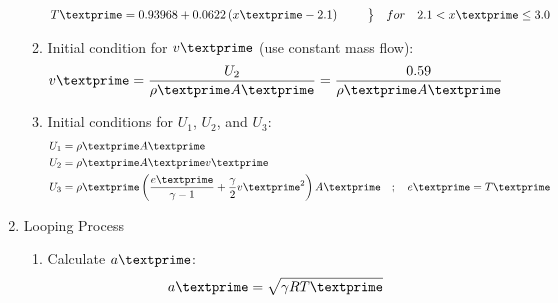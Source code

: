 \documentclass[12pt]{article}
\newenvironment{rcases}
	{\left.\begin{aligned}}
	{\end{aligned}\hspace{1.5em}\right\rbrace}
\begin{document}
\begin{enumerate}
\begin{enumerate}
\begin{equation}
\begin{rcases}
					T\textprime	&= 0.93968 + 0.0622\left(x\textprime - 2.1\right)
				\end{rcases}
				\hspace{1em}for\hspace{1em}2.1 < x\textprime \leq 3.0
			\end{equation}
		\item Initial condition for $v\textprime$ (use constant mass flow):
			\begin{equation}
				v\textprime = \frac{U_{2}}{\rho\textprime A\textprime} = \frac{0.59}{\rho\textprime A\textprime}
			\end{equation}
		\item Initial conditions for $U_{1}$, $U_{2}$, and $U_{3}$:
			\begin{align}
				U_{1}	&=	\rho\textprime A\textprime \\
				U_{2}	&=	\rho\textprime A\textprime v\textprime \\
				U_{3}	&=	\rho\textprime\left(\frac{e\textprime}{\gamma - 1} + \frac{\gamma}{2}v\textprime^{2}\right)A\textprime\hspace{1em};\hspace{1em}e\textprime = T\textprime
			\end{align}
	\end{enumerate}
	\item Looping Process
	\begin{enumerate}
		\item Calculate $a\textprime$:
			\begin{equation}
				a\textprime = \sqrt{\gamma R T\textprime}
			\end{equation}


\end{enumerate}
\end{enumerate}
\end{document}
